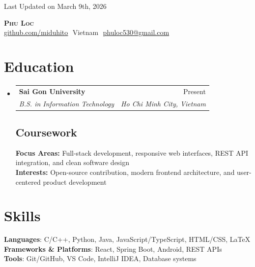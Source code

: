 \documentclass[letterpaper,11pt]{article}
\makeatletter
\newcommand{\resumeSubheading}[4]{
  \vspace{-2pt}\item
    \begin{tabular*}{0.97\textwidth}[t]{l@{\extracolsep{\fill}}r}
      \textbf{#1} & #2 \\
      \textit{\small#3} & \textit{\small #4} \\
    \end{tabular*}\vspace{-7pt}
}
\newcommand{\resumeSubHeadingListStart}{\begin{itemize}[leftmargin=0.15in, label={}]}
\newcommand{\resumeSubHeadingListEnd}{\end{itemize}}
\makeatother
\begin{document}
\begin{flushright}
  \color{gray}
  \item
  Last Updated on March 9th, 2026
\end{flushright}

\vspace{-5pt}

\begin{center}
  \textbf{\Huge \scshape Phu Loc} \\ \vspace{8pt}
    \small 
  \href{https://github.com/miduhito}{\underline{github.com/miduhito}} $  $
  Vietnam $  $
  \href{mailto:phuloc530@gmail.com}
  {\underline{phuloc530@gmail.com}}
\end{center}

\section{Education}
  \resumeSubHeadingListStart
  
    \resumeSubheading
      {Sai Gon University}{Present}
      {B.S. in Information Technology}{Ho Chi Minh City, Vietnam}

    \vspace{-10pt}

    \subsection{Coursework}
      \textbf{Focus Areas:} Full-stack development, responsive web interfaces, REST API integration, and clean software design \\
      \textbf{Interests:} Open-source contribution, modern frontend architecture, and user-centered product development

  \resumeSubHeadingListEnd

\section{Skills}
 \begin{itemize}[leftmargin=0.15in, label={}]
    \small{\item{
    
     \textbf{Languages}{: C/C++, Python, Java, JavaScript/TypeScript, HTML/CSS, \LaTeX} \\
     
    \textbf{Frameworks \& Platforms}{: React, Spring Boot, Android, REST APIs} \\

    \textbf{Tools}{: Git/GitHub, VS Code, IntelliJ IDEA, Database systems}
     
     
     
    }}
 \end{itemize}
\end{document}
